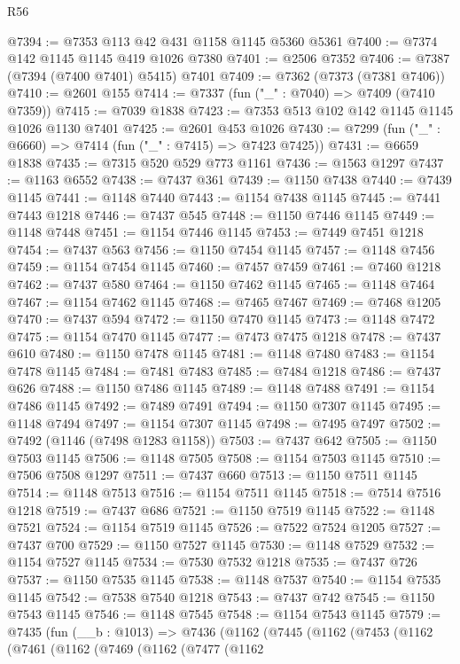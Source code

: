 \begin{lexlean}{R56}
\begin{coremodule}
@7394 := @7353 @113 @42 @431 @1158 @1145 @5360 @5361
@7400 := @7374 @142 @1145 @1145 @419 @1026 @7380
@7401 := @2506 @7352
@7406 := @7387 (@7394 (@7400 @7401) @5415) @7401
@7409 := @7362 (@7373 (@7381 @7406))
@7410 := @2601 @155
@7414 := @7337 (fun ("_" : @7040) => @7409 (@7410 @7359))
@7415 := @7039 @1838
@7423 := @7353 @513 @102 @142 @1145 @1145 @1026 @1130 @7401
@7425 := @2601 @453 @1026
@7430 := @7299 (fun ("_" : @6660) => @7414 (fun ("_" : @7415) => @7423 @7425))
@7431 := @6659 @1838
@7435 := @7315 @520 @529 @773 @1161
@7436 := @1563 @1297
@7437 := @1163 @6552
@7438 := @7437 @361
@7439 := @1150 @7438
@7440 := @7439 @1145
@7441 := @1148 @7440
@7443 := @1154 @7438 @1145
@7445 := @7441 @7443 @1218
@7446 := @7437 @545
@7448 := @1150 @7446 @1145
@7449 := @1148 @7448
@7451 := @1154 @7446 @1145
@7453 := @7449 @7451 @1218
@7454 := @7437 @563
@7456 := @1150 @7454 @1145
@7457 := @1148 @7456
@7459 := @1154 @7454 @1145
@7460 := @7457 @7459
@7461 := @7460 @1218
@7462 := @7437 @580
@7464 := @1150 @7462 @1145
@7465 := @1148 @7464
@7467 := @1154 @7462 @1145
@7468 := @7465 @7467
@7469 := @7468 @1205
@7470 := @7437 @594
@7472 := @1150 @7470 @1145
@7473 := @1148 @7472
@7475 := @1154 @7470 @1145
@7477 := @7473 @7475 @1218
@7478 := @7437 @610
@7480 := @1150 @7478 @1145
@7481 := @1148 @7480
@7483 := @1154 @7478 @1145
@7484 := @7481 @7483
@7485 := @7484 @1218
@7486 := @7437 @626
@7488 := @1150 @7486 @1145
@7489 := @1148 @7488
@7491 := @1154 @7486 @1145
@7492 := @7489 @7491
@7494 := @1150 @7307 @1145
@7495 := @1148 @7494
@7497 := @1154 @7307 @1145
@7498 := @7495 @7497
@7502 := @7492 (@1146 (@7498 @1283 @1158))
@7503 := @7437 @642
@7505 := @1150 @7503 @1145
@7506 := @1148 @7505
@7508 := @1154 @7503 @1145
@7510 := @7506 @7508 @1297
@7511 := @7437 @660
@7513 := @1150 @7511 @1145
@7514 := @1148 @7513
@7516 := @1154 @7511 @1145
@7518 := @7514 @7516 @1218
@7519 := @7437 @686
@7521 := @1150 @7519 @1145
@7522 := @1148 @7521
@7524 := @1154 @7519 @1145
@7526 := @7522 @7524 @1205
@7527 := @7437 @700
@7529 := @1150 @7527 @1145
@7530 := @1148 @7529
@7532 := @1154 @7527 @1145
@7534 := @7530 @7532 @1218
@7535 := @7437 @726
@7537 := @1150 @7535 @1145
@7538 := @1148 @7537
@7540 := @1154 @7535 @1145
@7542 := @7538 @7540 @1218
@7543 := @7437 @742
@7545 := @1150 @7543 @1145
@7546 := @1148 @7545
@7548 := @1154 @7543 @1145
@7579 := @7435
    (fun (__b : @1013) =>
    @7436
      (@1162
        (@7445
          (@1162
            (@7453
              (@1162
                (@7461
                  (@1162
                    (@7469
                      (@1162
                        (@7477
                          (@1162

\end{coremodule}
\end{lexlean}
